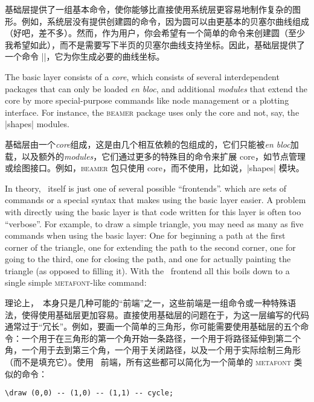 \begin{description}
        基础层提供了一组基本命令，使你能够比直接使用系统层更容易地制作复杂的图形。例如，系统层没有提供创建圆的命令，因为圆可以由更基本的贝塞尔曲线组成（好吧，差不多）。然而，作为用户，你会希望有一个简单的命令来创建圆（至少我希望如此），而不是需要写下半页的贝塞尔曲线支持坐标。因此，基础层提供了一个命令 |\pgfpathcircle|，它为你生成必要的曲线坐标。

        The basic layer consists of a \emph{core}, which consists of several
        interdependent packages that can only be loaded \emph{en bloc}, and
        additional \emph{modules} that extend the core by more
        special-purpose commands like node management or a plotting
        interface. For instance, the \textsc{beamer} package uses only the
        core and not, say, the |shapes| modules.

        基础层由一个\emph{core}组成，这是由几个相互依赖的包组成的，它们只能被\emph{en bloc}加载，以及额外的\emph{modules}，它们通过更多的特殊目的命令来扩展 core，如节点管理或绘图接口。例如，\textsc{beamer} 包只使用 core，而不使用，比如说，|shapes| 模块。
\end{description}

In theory, \tikzname\ itself is just one of several possible ``frontends''.
which are sets of commands or a special syntax that makes using the basic layer
easier. A problem with directly using the basic layer is that code written for
this layer is often too ``verbose''. For example, to draw a simple triangle,
you may need as many as five commands when using the basic layer: One for
beginning a path at the first corner of the triangle, one for extending the
path to the second corner, one for going to the third, one for closing the
path, and one for actually painting the triangle (as opposed to filling it).
With the \tikzname\ frontend all this boils down to a single simple
\textsc{metafont}-like command:

理论上，\tikzname\ 本身只是几种可能的“前端”之一，这些前端是一组命令或一种特殊语法，使得使用基础层更加容易。直接使用基础层的问题在于，为这一层编写的代码通常过于“冗长”。例如，要画一个简单的三角形，你可能需要使用基础层的五个命令：一个用于在三角形的第一个角开始一条路径，一个用于将路径延伸到第二个角，一个用于去到第三个角，一个用于关闭路径，以及一个用于实际绘制三角形（而不是填充它）。使用 \tikzname\ 前端，所有这些都可以简化为一个简单的 \textsc{metafont} 类似的命令：
%
\begin{verbatim}
\draw (0,0) -- (1,0) -- (1,1) -- cycle;
\end{verbatim}

